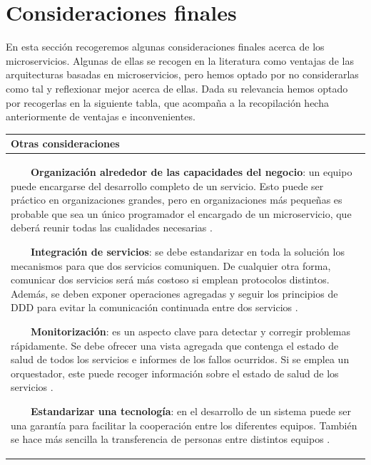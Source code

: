 \documentclass[11pt,spanish,listoffigures]{tfgetsinf}
\newcommand{\tabitem}{~~\llap{\textbullet}~~}
\begin{document}
\section{Consideraciones finales}

En esta sección recogeremos algunas consideraciones finales acerca de los microservicios. Algunas de ellas se recogen en la literatura como ventajas de las arquitecturas basadas en microservicios, pero hemos optado por no considerarlas como tal y reflexionar mejor acerca de ellas. Dada su relevancia hemos optado por recogerlas en la siguiente tabla, que acompaña a la recopilación hecha anteriormente de ventajas e inconvenientes.

\begin{center}
\begin{tabular}{|p{14.2cm}|}
\hline

\textbf{ Otras consideraciones } \\
\hline

\vspace{2mm}
\tabitem \textbf{Organización alrededor de las capacidades del negocio}: un equipo puede encargarse del desarrollo completo de un servicio. Esto puede ser práctico en organizaciones grandes, pero en organizaciones más pequeñas es probable que sea un único programador el encargado de un microservicio, que deberá reunir todas las cualidades necesarias \cite{Newman2015a, Lewis2014, DelaTorre2018, Hunter2017}.

\vspace{2mm}
\tabitem \textbf{Integración de servicios}: se debe estandarizar en toda la solución los mecanismos para que dos servicios comuniquen. De cualquier otra forma, comunicar dos servicios será más costoso si emplean protocolos distintos. Además, se deben exponer operaciones agregadas y seguir los principios de DDD para evitar la comunicación continuada entre dos servicios \cite{Newman2015a, DelaTorre2018}.

\vspace{2mm}
\tabitem \textbf{Monitorización}: es un aspecto clave para detectar y corregir problemas rápidamente. Se debe ofrecer una vista agregada que contenga el estado de salud  de todos los servicios e informes de los fallos ocurridos. Si se emplea un orquestador, este puede recoger información sobre el estado de salud de los servicios \cite{Newman2015a, DelaTorre2018}.

\vspace{2mm}
\tabitem \textbf{Estandarizar una tecnología}: en el desarrollo de un sistema puede ser una garantía para facilitar la cooperación entre los diferentes equipos. También se hace más sencilla la transferencia de personas entre distintos equipos \cite{Newman2015a}.


\end{tabular}
\end{center}
\end{document}

